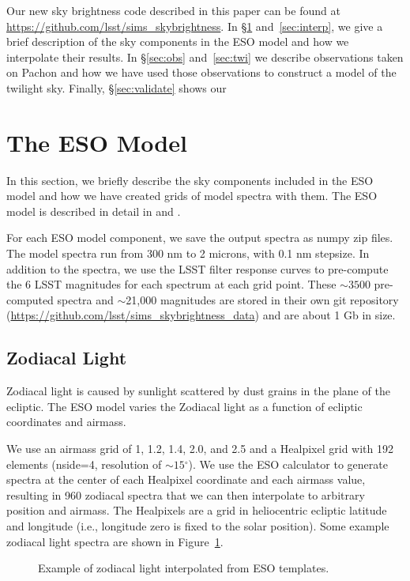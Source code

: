 \documentclass{emulateapj}  %
\newcommand\degree{{^\circ}}
\begin{document}
Our new sky brightness code described in this paper can be found at \url{https://github.com/lsst/sims\_skybrightness}. In \S\ref{sec:eso} and~\ref{sec:interp}, we give a brief description of the sky components in the ESO model and how we interpolate their results. In \S\ref{sec:obs} and~\ref{sec:twi} we describe observations taken on Pachon and how we have used those observations to construct a model of the twilight sky.  Finally, \S\ref{sec:validate} shows our 

\section{The ESO Model}\label{sec:eso}
In this section, we briefly describe the sky components included in the ESO model and how we have created grids of model spectra with them. The ESO model is described in detail in \citet{Noll12} and \citet{Jones13}.

For each ESO model component, we save the output spectra as numpy zip files.  The model spectra run from 300 nm to 2 microns, with 0.1 nm stepsize.  In addition to the spectra, we use the LSST filter response curves to pre-compute the 6 LSST magnitudes for each spectrum at each grid point. These $\sim3500$ pre-computed spectra and $\sim$21,000 magnitudes are stored in their own git repository (\url{https://github.com/lsst/sims\_skybrightness\_data}) and are about 1 Gb in size.

\subsection{Zodiacal Light}
Zodiacal light is caused by sunlight scattered by dust grains in the plane of the ecliptic.  The ESO model varies the Zodiacal light as a function of ecliptic coordinates and airmass.  

We use an airmass grid of 1, 1.2, 1.4, 2.0, and 2.5 and a Healpixel \citep{Gorski99} grid with 192 elements (nside=4, resolution of $\sim15\degree$).  We use the ESO calculator to generate spectra at the center of each Healpixel coordinate and each airmass value, resulting in 960 zodiacal spectra that we can then interpolate to arbitrary position and airmass.  The Healpixels are a grid in heliocentric ecliptic latitude and longitude (i.e., longitude zero is fixed to the solar position).  Some example zodiacal light spectra are shown in Figure~\ref{fig:zodiacal}. 


\begin{figure}
  \caption{Example of zodiacal light interpolated from ESO templates. \label{fig:zodiacal}}
\end{figure}
\end{document}
